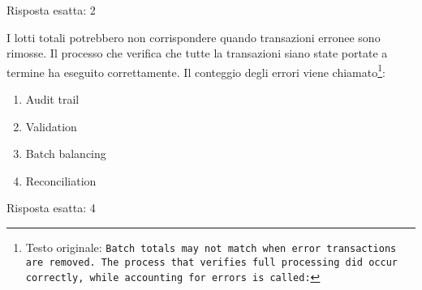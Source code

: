 \begin{Answer} [
  ref={esCs2},
  number={2}
  ]

  \Question Risposta esatta: 2
\end{Answer}


\begin{Exercise} [
  title={Quiz},
  label={esCs3}
  ]

  \Question I lotti totali potrebbero non corrispondere quando transazioni
erronee sono rimosse. Il processo che verifica che tutte la transazioni siano
state portate a termine ha eseguito correttamente. Il conteggio degli errori
viene chiamato\footnote{Testo originale: \texttt{Batch totals may not match when
error transactions are removed. The process that verifies full processing did
occur correctly, while accounting for errors is called:}}:

\begin{enumerate}
\item Audit trail
\item Validation
\item Batch balancing
\item Reconciliation
\end{enumerate}


\end{Exercise}

\begin{Answer} [
  ref={esCs3},
  number={3}
  ]

  \Question Risposta esatta: 4
\end{Answer}
